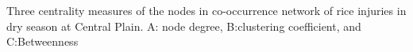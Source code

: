 Three centrality measures of the nodes in co-occurrence network of rice injuries in dry season at Central Plain. A: node degree, B:clustering coefficient, and C:Betweenness
\label{fig:nodepropCP_ws}